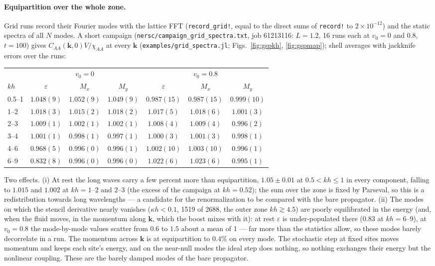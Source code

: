 \documentclass[11pt,aps,preprint,nofootinbib,superscriptaddress,tightenlines]{revtex4-2}
\let\oldparagraph\paragraph
\renewcommand{\paragraph}{\par\bigskip\oldparagraph}
\begin{document}
\paragraph{Equipartition over the whole zone.}  Grid runs record their Fourier modes with the lattice FFT
(\texttt{record\_grid!}, equal to the direct sums of \texttt{record!} to $2\times10^{-12}$) and the static spectra of all $N$
modes.  A short campaign (\texttt{nersc/campaign\_grid\_spectra.txt}, job 61213116: $L=1.2$, 16 runs each at
$v_0=0$ and $0.8$, $t=100$) gives $C_{AA}(\bm k,0)V/\chi_{AA}$ at every $\bm k$ (\texttt{examples/grid\_spectra.jl};
Figs.~\ref{fig:gspkh}, \ref{fig:gspmap}); shell averages with jackknife errors over the runs:
\begin{center}
\begin{tabular}{lcccccc}
\hline
 & \multicolumn{3}{c}{$v_0=0$} & \multicolumn{3}{c}{$v_0=0.8$} \\
$kh$ & $\varepsilon$ & $M_x$ & $M_y$ & $\varepsilon$ & $M_x$ & $M_y$ \\ \hline
0.5--1 & $1.048(9)$ & $1.052(9)$ & $1.049(9)$ & $0.987(15)$ & $0.987(15)$ & $0.999(10)$ \\
1--2 & $1.018(3)$ & $1.015(2)$ & $1.018(2)$ & $1.017(5)$ & $1.018(6)$ & $1.001(3)$ \\
2--3 & $1.009(1)$ & $1.002(1)$ & $1.002(1)$ & $1.008(4)$ & $1.009(4)$ & $0.996(2)$ \\
3--4 & $1.001(1)$ & $0.998(1)$ & $0.997(1)$ & $1.000(3)$ & $1.001(3)$ & $0.998(1)$ \\
4--6 & $0.968(5)$ & $0.996(0)$ & $0.996(1)$ & $1.002(10)$ & $1.003(10)$ & $0.996(1)$ \\
6--9 & $0.832(8)$ & $0.996(0)$ & $0.996(0)$ & $1.022(6)$ & $1.023(6)$ & $0.995(1)$ \\
\hline
\end{tabular}
\end{center}
Two effects.  (i) At rest the long waves carry a few percent more than equipartition, $1.05\pm0.01$ at
$0.5<kh\le1$ in every component, falling to $1.015$ and $1.002$ at $kh=1$--$2$ and $2$--$3$ (the excess of the
campaign at $kh=0.52$); the sum over the zone is fixed by Parseval, so this is a redistribution towards
long wavelengths --- a candidate for the renormalization to be compared with the bare propagator.
(ii) The modes on which the stencil derivative nearly vanishes ($\kappa h<0.1$, 1519 of 2688, the outer zone
$kh\gtrsim4.5$) are poorly equilibrated in the energy (and, when the fluid moves, in the momentum along
$\bm k$, which the boost mixes with it): at rest $\varepsilon$ is under-populated there ($0.83$ at $kh=6$--$9$), at
$v_0=0.8$ the mode-by-mode values scatter from $0.6$ to $1.5$ about a mean of 1 --- far more than the
statistics allow, so these modes barely decorrelate in a run.  The momentum across $\bm k$ is at
equipartition to $0.4\%$ on every mode.  The stochastic step at fixed sites moves momentum and keeps each
site's energy, and on the near-null modes the ideal step does nothing, so nothing exchanges their
energy but the nonlinear coupling.  These are the barely damped modes of the bare propagator.
\end{document}
